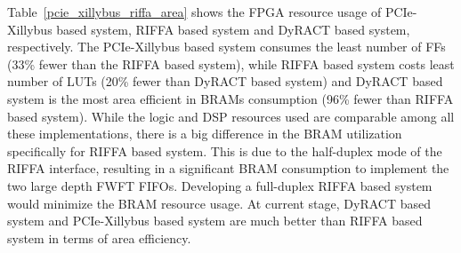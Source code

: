 Table~\ref{pcie_xillybus_riffa_area} shows the FPGA resource usage of PCIe-Xillybus based system, RIFFA based system and DyRACT based system, respectively. 
The PCIe-Xillybus based system consumes the least number of FFs (33\% fewer than the RIFFA based system), while RIFFA based system costs least number of LUTs (20\% fewer than DyRACT based system) and DyRACT based system is the most area efficient in BRAMs consumption (96\% fewer than RIFFA based system). 
While the logic and DSP resources used are comparable among all these implementations, there is a big difference in the BRAM utilization specifically for RIFFA based system. 
This is due to the half-duplex mode of the RIFFA interface, resulting in a significant BRAM consumption to implement the two large depth FWFT FIFOs. 
Developing a full-duplex RIFFA based system would minimize the BRAM resource usage. 
At current stage, DyRACT based system and PCIe-Xillybus based system are much better than RIFFA based system in terms of area efficiency. 
 
\begin{table}[tb]
	\caption{Area overhead of PCIe-based systems.}
	\label{pcie_xillybus_riffa_area}
	\centering
\end{table}
